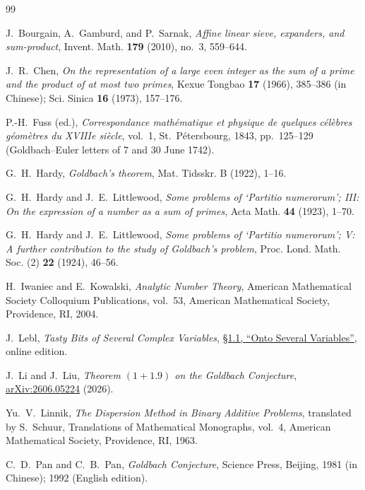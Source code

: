 \documentclass[12pt,a4paper]{amsart}
\numberwithin{equation}{section}
\theoremstyle{plain}
\theoremstyle{definition}
\theoremstyle{remark}
\begin{document}
\begin{thebibliography}{99}

J.~Bourgain, A.~Gamburd, and P.~Sarnak,
\emph{Affine linear sieve, expanders, and sum-product},
Invent. Math. \textbf{179} (2010), no.~3, 559--644.

J.~R.~Chen,
\emph{On the representation of a large even integer as the sum
of a prime and the product of at most two primes},
Kexue Tongbao \textbf{17} (1966), 385--386 (in Chinese);
Sci. Sinica \textbf{16} (1973), 157--176.

P.-H.~Fuss (ed.),
\emph{Correspondance math\'ematique et physique de quelques
c\'el\`ebres g\'eom\`etres du XVIIIe si\`ecle},
vol.~1, St.~P\'etersbourg, 1843, pp.~125--129
(Goldbach--Euler letters of 7 and 30 June 1742).

G.~H.~Hardy,
\emph{Goldbach's theorem},
Mat. Tidsskr. B (1922), 1--16.

G.~H.~Hardy and J.~E.~Littlewood,
\emph{Some problems of `Partitio numerorum'; III:
On the expression of a number as a sum of primes},
Acta Math. \textbf{44} (1923), 1--70.

G.~H.~Hardy and J.~E.~Littlewood,
\emph{Some problems of `Partitio numerorum'; V:
A further contribution to the study of Goldbach's problem},
Proc. Lond. Math. Soc. (2) \textbf{22} (1924), 46--56.

H.~Iwaniec and E.~Kowalski,
\emph{Analytic Number Theory},
American Mathematical Society Colloquium Publications, vol.~53,
American Mathematical Society, Providence, RI, 2004.

J.~Lebl,
\emph{Tasty Bits of Several Complex Variables},
\href{https://math.libretexts.org/Bookshelves/Analysis/Tasty_Bits_of_Several_Complex_Variables_(Lebl)/01:_Holomorphic_Functions_in_Several_Variables/1.01:_Onto_Several_Variables}
{\S1.1, ``Onto Several Variables''}, online edition.

J.~Li and J.~Liu,
\emph{Theorem $(1+1.9)$ on the Goldbach Conjecture},
\href{https://arxiv.org/abs/2606.05224}{arXiv:2606.05224} (2026).

Yu.~V.~Linnik,
\emph{The Dispersion Method in Binary Additive Problems},
translated by S.~Schuur,
Translations of Mathematical Monographs, vol.~4,
American Mathematical Society, Providence, RI, 1963.

C.~D.~Pan and C.~B.~Pan,
\emph{Goldbach Conjecture},
Science Press, Beijing, 1981 (in Chinese); 1992 (English edition).


\end{thebibliography}
\end{document}
